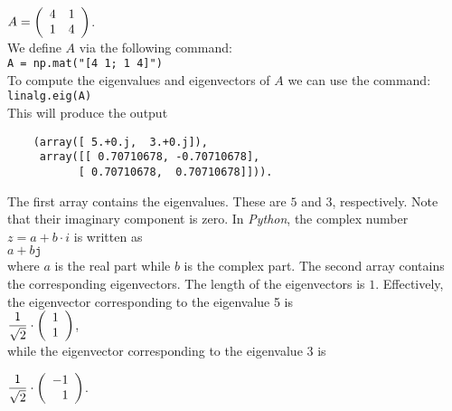 \documentclass{report}
\begin{document}
\\[0.2cm]
\hspace*{1.3cm}
$A = \left(
\begin{array}[c]{lll}
  4 & 1 \\
  1 & 4
\end{array}
\right)
$.
\\[0.2cm]
We define $A$ via the following command:
\\[0.2cm]
\hspace*{1.3cm}
\texttt{A = np.mat("[4 1; 1 4]")}
\\[0.2cm]
To compute the eigenvalues and eigenvectors of $A$ we can use the command:
\\[0.2cm]
\hspace*{1.3cm}
\texttt{linalg.eig(A)}
\\[0.2cm]
This will produce the output
\begin{verbatim}
    (array([ 5.+0.j,  3.+0.j]),
     array([[ 0.70710678, -0.70710678],
           [ 0.70710678,  0.70710678]])).
\end{verbatim}
The first array contains the eigenvalues.  These are $5$ and $3$, respectively.  
Note that their imaginary component is zero.  In
\textsl{Python}, the complex number $z = a + b \cdot i$ is written as
\\[0.2cm]
\hspace*{1.3cm}
$a+b\mathtt{j}$
\\[0.2cm]
where $a$ is the real part while $b$ is the complex part.  
The second array contains the corresponding eigenvectors.  The length of the eigenvectors is $1$.
Effectively, the eigenvector corresponding to the eigenvalue 5 is
\\[0.2cm]
\hspace*{1.3cm}
$\displaystyle
  \frac{1}{\sqrt{2}} \cdot
  \left(
  \begin{array}[c]{l}
    1 \\ 1
  \end{array}
\right)
$,
\\[0.2cm]
while the eigenvector corresponding to the eigenvalue 3 is
\\[0.2cm]
\hspace*{1.3cm}

$\displaystyle
  \frac{1}{\sqrt{2}} \cdot
  \left(
  \begin{array}[c]{r}
    -1 \\ 1
  \end{array}
\right)
$.
\end{document}
